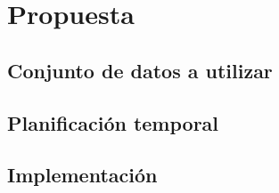 \section{Propuesta}


\subsection{Conjunto de datos a utilizar}

\subsection{Planificación temporal}


\subsection{Implementación}
